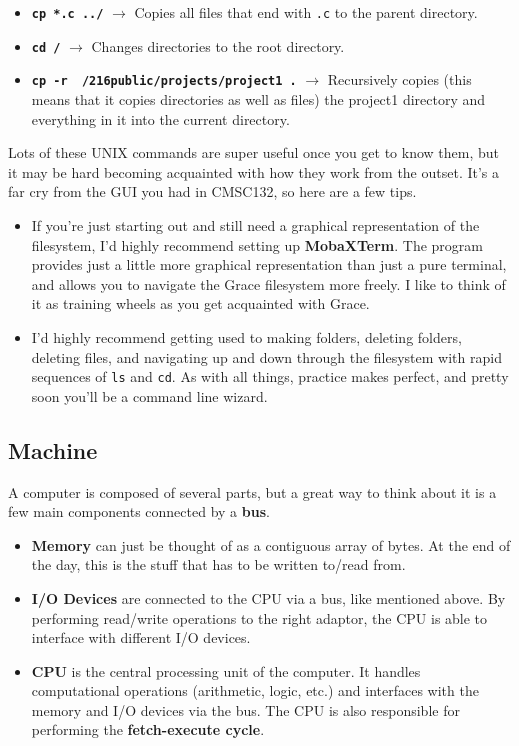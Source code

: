 \documentclass[english, 10pt]{article}
\begin{document}
\begin{itemize}
	\begin{itemize}
		\item \textbf{\texttt{cp *.c ../}} $\rightarrow$ Copies all files that end with \texttt{.c} to the parent directory.
		\item \textbf{\texttt{cd /}} $\rightarrow$ Changes directories to the root directory.
		\item \textbf{\texttt{cp -r ~/216public/projects/project1 .}} $\rightarrow$ Recursively copies (this means that it copies directories as well as files) the project1 directory and everything in it into the current directory.
	\end{itemize}
\end{itemize}

Lots of these UNIX commands are super useful once you get to know them, but it may be hard becoming acquainted with how they work from the outset. It's a far cry from the GUI you had in CMSC132, so here are a few tips.

\begin{itemize}
	\item If you're just starting out and still need a graphical representation of the filesystem, I'd highly recommend setting up \textbf{MobaXTerm}. The program provides just a little more graphical representation than just a pure terminal, and allows you to navigate the Grace filesystem more freely. I like to think of it as training wheels as you get acquainted with Grace.
	\item I'd highly recommend getting used to making folders, deleting folders, deleting files, and navigating up and down through the filesystem with rapid sequences of \texttt{ls} and \texttt{cd}. As with all things, practice makes perfect, and pretty soon you'll be a command line wizard.
\end{itemize}

\subsection{Machine}

A computer is composed of several parts, but a great way to think about it is a few main components connected by a \textbf{bus}. \newline

\begin{itemize}
	\item \textbf{Memory} can just be thought of as a contiguous array of bytes. At the end of the day, this is the stuff that has to be written to/read from.
	\item \textbf{I/O Devices} are connected to the CPU via a bus, like mentioned above. By performing read/write operations to the right adaptor, the CPU is able to interface with different I/O devices.
	\item \textbf{CPU} is the central processing unit of the computer. It handles computational operations (arithmetic, logic, etc.) and interfaces with the memory and I/O devices via the bus. The CPU is also responsible for performing the \textbf{fetch-execute cycle}.
\end{itemize}
\end{document}
